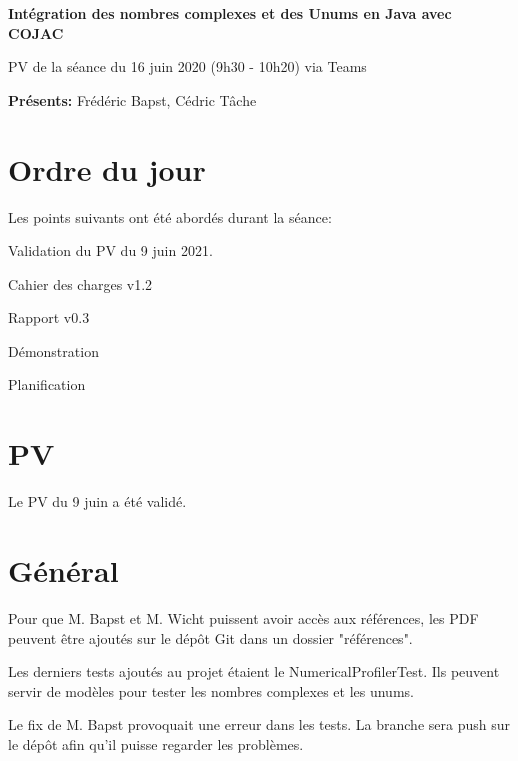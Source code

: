 \documentclass[11pt]{meetingmins}
\date{16 juin 2021}
\begin{document}
\begin {center} {
    \large \textbf {Intégration des nombres complexes et des Unums en Java avec COJAC}
}
\vspace {0.5ex}

PV de la séance du 16 juin 2020 (9h30 - 10h20) via Teams
\end {center} \vspace {1.5em}

\noindent
\textbf{Présents:} Frédéric Bapst, Cédric Tâche

\section{Ordre du jour}
Les points suivants ont été abordés durant la séance:
\begin{hiddenitems}
    \item Validation du PV du 9 juin 2021.
    \item Cahier des charges v1.2
    \item Rapport v0.3
    \item Démonstration
    \item Planification
\end{hiddenitems}

\section{PV}
\begin{hiddenitems}
    \item Le PV du 9 juin a été validé.
\end{hiddenitems}

\section{Général}
\begin{hiddenitems}
    \item Pour que M. Bapst et M. Wicht puissent avoir accès aux références, les PDF peuvent être ajoutés sur le dépôt Git dans un dossier "références".
    \item Les derniers tests ajoutés au projet étaient le NumericalProfilerTest. Ils peuvent servir de modèles pour tester les nombres complexes et les unums.
    \item Le fix de M. Bapst provoquait une erreur dans les tests. La branche sera push sur le dépôt afin qu'il puisse regarder les problèmes.
\end{hiddenitems}
\end{document}
